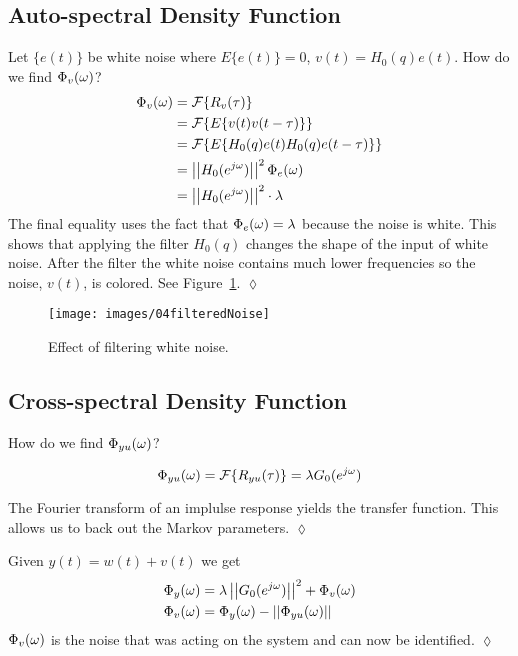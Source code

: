\subsection{Auto-spectral Density Function}
\begin{example}
Let $\{e(t)\}$ be white noise where $E\{e(t)\}=0$, $v(t)=H_0(q)e(t)$.
How do we find $\Phi_v(\omega)$?
\begin{align*}
\Phi_v(\omega) &= \mathcal{F}\{R_v(\tau)\} \\
&= \mathcal{F}\{E\{v(t)v(t-\tau)\}\} \\
&= \mathcal{F}\{E\{H_0(q)e(t)H_0(q)e(t-\tau)\}\} \\
&= \left|\left|H_0(e^{j\omega})\right|\right|^2\Phi_e(\omega) \\
&= \left|\left|H_0(e^{j\omega})\right|\right|^2\cdot\lambda
\end{align*}
The final equality uses the fact that $\Phi_e(\omega)=\lambda$ because the noise is white.
This shows that applying the filter $H_0(q)$ changes the shape of the input of white noise.
After the filter the white noise contains much lower frequencies so the noise, $v(t)$, is colored.
See Figure~\ref{fig:04filteredNoise}.
$\lozenge$
\end{example}
\begin{figure}[ht!]
\centering
\texttt{[image: images/04filteredNoise]}
\caption{Effect of filtering white noise.}%
\label{fig:04filteredNoise}
\end{figure}

\subsection{Cross-spectral Density Function}
\begin{example}
How do we find $\Phi_{yu}(\omega)$?

\begin{equation*}
\Phi_{yu}(\omega) = \mathcal{F}\{R_{yu}(\tau)\} = \lambda G_0(e^{j\omega})
\end{equation*}

The Fourier transform of an implulse response yields the transfer function.
This allows us to back out the Markov parameters.
$\lozenge$
\end{example}

\begin{example}
Given $y(t)=w(t)+v(t)$ we get
\begin{align*}
\Phi_y(\omega) &= \lambda\left|\left|G_0(e^{j\omega})\right|\right|^2 + \Phi_v(\omega) \\
\Phi_v(\omega) &= \Phi_y(\omega) - \left|\left|\Phi_{yu}(\omega)\right|\right|
\end{align*}
$\Phi_v(\omega)$ is the noise that was acting on the system and can now be identified.
$\lozenge$
\end{example}

